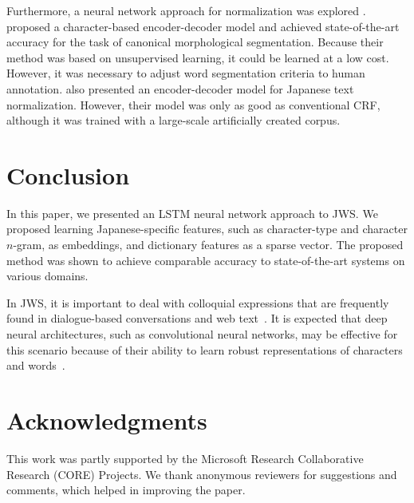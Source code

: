 \documentclass[11pt]{article}
\begin{document}
Furthermore, a neural network approach for normalization was explored
\cite{kann-cotterell-schutze:2016:EMNLP2016,ikeda2016norm}.
 proposed a character-based
encoder-decoder model and achieved state-of-the-art accuracy for the task of
canonical morphological segmentation.
Because their method was based on unsupervised learning, it could be learned
at a low cost. However, it was necessary to adjust word segmentation
criteria to human annotation.
 also presented an encoder-decoder model for Japanese
text normalization. However, their model was only as good as conventional
CRF, although it was trained with a large-scale artificially created corpus.


\section{Conclusion}
In this paper, we presented an LSTM neural network approach to JWS.
We proposed learning Japanese-specific features, such as character-type and character
$n$-gram, as embeddings, and dictionary features as a sparse vector.
The proposed method was shown to achieve comparable accuracy to 
state-of-the-art systems on various domains. 


In JWS, it is important to deal with colloquial expressions that are
frequently found in dialogue-based conversations and web
text~\cite{saito-EtAl:2014:Coling,sasano-kurohashi-okumura:2013:IJCNLP,kaji-kitsuregawa:2014:EMNLP2014}.
It is expected that deep neural architectures, such as convolutional neural
networks, may be effective for this scenario because of their ability to learn
robust representations of characters and words~\cite{ling-EtAl:2015:EMNLP2}.

\section*{Acknowledgments}
This work was partly supported by the Microsoft Research Collaborative Research
(CORE) Projects. We thank anonymous reviewers for suggestions and comments,
which helped in improving the paper.



\end{document}
